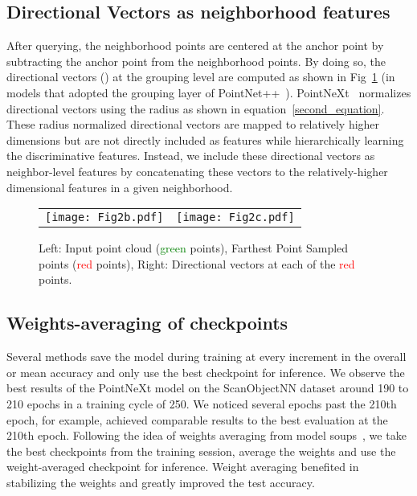 \documentclass[runningheads]{llncs}
\begin{document}
\subsection{Directional Vectors as neighborhood features}

After querying, the neighborhood points are centered at the anchor point by subtracting the anchor point from the neighborhood points. By doing so, the directional vectors () at the grouping level are computed as shown in Fig~\ref{Fig2} (in models that adopted the grouping layer of PointNet++~\cite{qi2017pointnet++}).  PointNeXt~\cite{PointNeXt} normalizes directional vectors using the radius  as shown in equation~\ref{second_equation}. These radius normalized directional vectors are mapped to relatively higher dimensions but are not directly included as features while hierarchically learning the discriminative features. Instead, we include these directional vectors as neighbor-level features by concatenating these vectors to the relatively-higher dimensional features in a given neighborhood. 



\begin{figure}[ht]
\centering
\begin{tabular}{ll}

\texttt{[image: Fig2b.pdf]} &
\texttt{[image: Fig2c.pdf]} \end{tabular}
\caption{Left: Input point cloud (\textcolor{green}{green} points), Farthest Point Sampled points (\textcolor{red}{red} points), Right: Directional vectors at each of the \textcolor{red}{red} points.}
\label{Fig2}
\end{figure}

\subsection{Weights-averaging of checkpoints}
Several methods save the model during training at every increment in the overall or mean accuracy and only use the best checkpoint for inference. We observe the best results of the PointNeXt model on the ScanObjectNN dataset around 190 to 210 epochs in a training cycle of 250. We noticed several epochs past the 210th epoch, for example, achieved comparable results to the best evaluation at the 210th epoch. Following the idea of weights averaging from model soups~\cite{wortsman2022model}, we take the best checkpoints from the training session, average the weights and use the weight-averaged checkpoint for inference. Weight averaging benefited in stabilizing the weights and greatly improved the test accuracy. 
\end{document}
